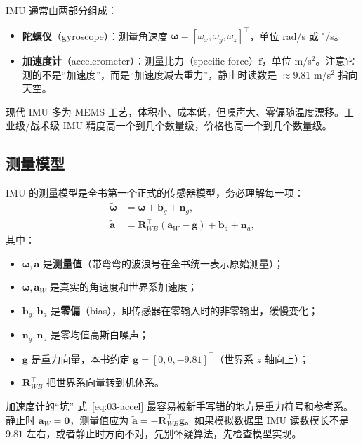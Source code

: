 IMU 通常由两部分组成：
\begin{itemize}
  \item \textbf{陀螺仪}（gyroscope）：测量角速度 $\bm{\omega}=[\omega_x,\omega_y,\omega_z]^{\top}$，单位 rad/s 或 $^\circ$/s。
  \item \textbf{加速度计}（accelerometer）：测量比力（specific force）$\bm{f}$，单位 m/s$^{2}$。注意它测的不是“加速度”，而是“加速度减去重力”，静止时读数是 $\approx 9.81$ m/s$^{2}$ 指向天空。
\end{itemize}

现代 IMU 多为 MEMS 工艺，体积小、成本低，但噪声大、零偏随温度漂移。工业级/战术级 IMU 精度高一个到几个数量级，价格也高一个到几个数量级。

\subsection{测量模型}

IMU 的测量模型是全书第一个正式的传感器模型，务必理解每一项：
\begin{align}
\tilde{\bm{\omega}}&=\bm{\omega}+\bm{b}_g+\bm{n}_g,\label{eq:03-gyro}\\
\tilde{\bm{a}}&=\bm{R}_{WB}^{\top}\left(\bm{a}_W-\bm{g}\right)+\bm{b}_a+\bm{n}_a,\label{eq:03-accel}
\end{align}
其中：
\begin{itemize}
  \item $\tilde{\bm{\omega}},\tilde{\bm{a}}$ 是\textbf{测量值}（带弯弯的波浪号在全书统一表示原始测量）；
  \item $\bm{\omega},\bm{a}_W$ 是真实的角速度和世界系加速度；
  \item $\bm{b}_g,\bm{b}_a$ 是\textbf{零偏}（bias），即传感器在零输入时的非零输出，缓慢变化；
  \item $\bm{n}_g,\bm{n}_a$ 是零均值高斯白噪声；
  \item $\bm{g}$ 是重力向量，本书约定 $\bm{g}=[0,0,-9.81]^{\top}$（世界系 $z$ 轴向上）；
  \item $\bm{R}_{WB}^{\top}$ 把世界系向量转到机体系。
\end{itemize}

\begin{keybox}{加速度计的“坑”}
式~\eqref{eq:03-accel} 最容易被新手写错的地方是重力符号和参考系。静止时 $\bm{a}_W=\bm{0}$，测量值应为 $\tilde{\bm{a}}=-\bm{R}_{WB}^{\top}\bm{g}$。如果模拟数据里 IMU 读数模长不是 $9.81$ 左右，或者静止时方向不对，先别怀疑算法，先检查模型实现。
\end{keybox}



